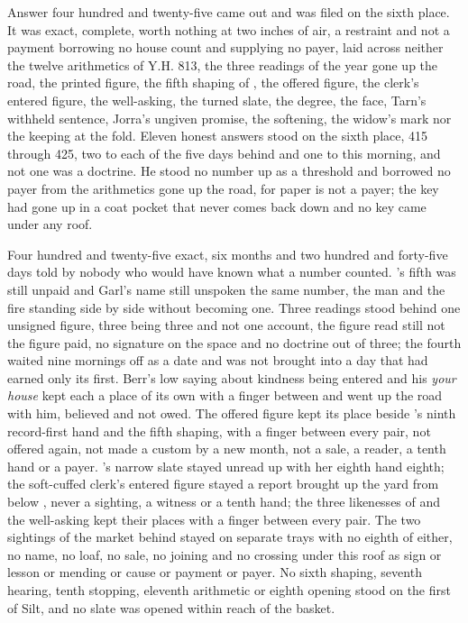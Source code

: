 \scenebreak

Answer four hundred and twenty-five came out and was filed on the sixth place. It was exact, complete, worth nothing at two inches of air, a restraint and not a payment borrowing no house count and supplying no payer, laid across neither the twelve arithmetics of Y.H. 813, the three readings of the year gone up the road, the printed figure, the fifth shaping of , the offered figure, the clerk's entered figure, the well-asking, the turned slate, the degree, the face, Tarn's withheld sentence, Jorra's ungiven promise, the softening, the widow's mark nor the keeping at the fold. Eleven honest answers stood on the sixth place, 415 through 425, two to each of the five days behind and one to this morning, and not one was a doctrine. He stood no number up as a threshold and borrowed no payer from the arithmetics gone up the road, for paper is not a payer; the key had gone up in a coat pocket that never comes back down and no key came under any roof.

Four hundred and twenty-five exact, six months and two hundred and forty-five days told by nobody who would have known what a number counted. 's fifth was still unpaid and Garl's name still unspoken the same number, the man and the fire standing side by side without becoming one. Three readings stood behind one unsigned figure, three being three and not one account, the figure read still not the figure paid, no signature on the space and no doctrine out of three; the fourth waited nine mornings off as a date and was not brought into a day that had earned only its first. Berr's low saying about kindness being entered and his \emph{your house} kept each a place of its own with a finger between and went up the road with him, believed and not owed. The offered figure kept its place beside 's ninth record-first hand and the fifth shaping, with a finger between every pair, not offered again, not made a custom by a new month, not a sale, a reader, a tenth hand or a payer. 's narrow slate stayed unread up  with her eighth hand eighth; the soft-cuffed clerk's entered figure stayed a report brought up the yard from  below , never a sighting, a witness or a tenth hand; the three likenesses of  and the well-asking kept their places with a finger between every pair. The two sightings of the market behind stayed on separate trays with no eighth of either, no name, no loaf, no sale, no joining and no crossing under this roof as sign or lesson or mending or cause or payment or payer. No sixth shaping, seventh hearing, tenth stopping, eleventh arithmetic or eighth opening stood on the first of Silt, and no slate was opened within reach of the basket.

